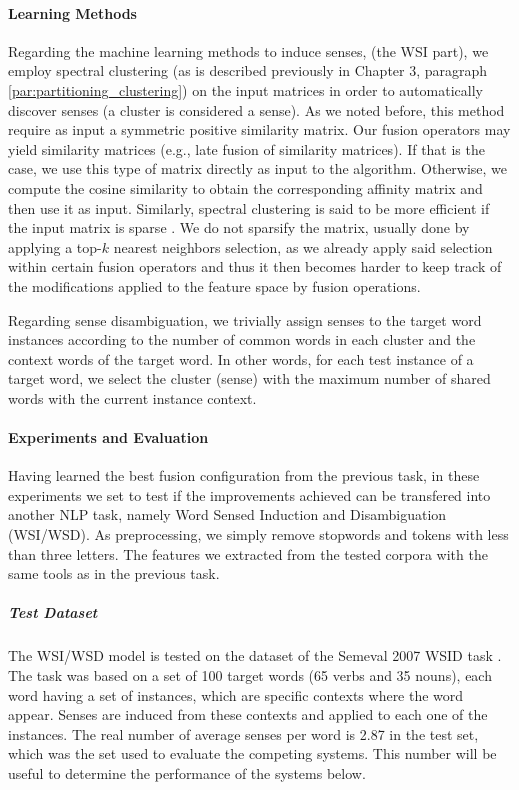 \paragraph{Learning Methods}
Regarding the machine learning methods to induce senses, (the WSI part), we employ spectral clustering (as is described previously in Chapter 3, paragraph \ref{par:partitioning_clustering}) on the input matrices in order to automatically discover senses (a cluster is considered a sense). As we noted before, this method require as input a symmetric positive similarity matrix. Our fusion operators may yield similarity matrices (e.g., late fusion of similarity matrices). If that is the case, we use this type of matrix directly as input to the algorithm. Otherwise, we compute the cosine similarity to obtain the corresponding affinity matrix and then use it as input. Similarly, spectral clustering is said to be more efficient if the input matrix is sparse \cite{song2008parallel}. We do not sparsify the matrix, usually done by applying a top-$k$ nearest neighbors selection, as we already apply said selection within certain fusion operators and thus it then becomes  harder to keep track of the modifications applied to the feature space by fusion operations.

 Regarding sense disambiguation, we trivially assign senses to the target word instances according to the number of common words in each cluster and the context words of the target word. In other words, for each test instance of a target word, we select the cluster (sense) with the maximum number of shared words with the current instance context.

\paragraph{Experiments and Evaluation}
Having learned the best fusion configuration from the previous task, in these experiments we set to test if the improvements achieved can be transfered into another NLP task, namely Word Sensed Induction and Disambiguation (WSI/WSD). As preprocessing, we simply remove stopwords and tokens with less than three letters. The features we extracted from the tested corpora with the same tools as in the previous task.
\subparagraph{Test Dataset}
The WSI/WSD model is tested on the dataset of  the Semeval 2007 WSID task \cite{Agirre2007}. The task was based on a set of 100 target words (65 verbs and 35 nouns), each  word having a set of instances, which are specific contexts where the word appear. Senses are induced from these contexts and applied to each one of the instances. The real number of average senses per word is 2.87 in the test set, which was the set used to evaluate the competing systems. This number will be useful to determine the performance of the systems below.



